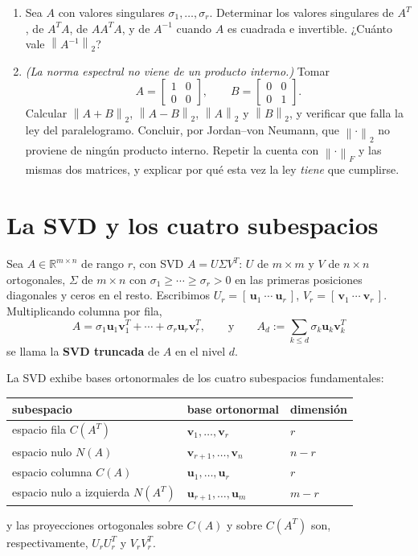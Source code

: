 \documentclass[11pt,a4paper]{article}
\newcommand{\R}{\mathbb{R}}
\newcommand{\bi}[1]{\boldsymbol{#1}}
\newcommand{\normF}[1]{\left\|#1\right\|_{F}}
\newcommand{\normdos}[1]{\left\|#1\right\|_{2}}
\begin{document}
\begin{enumerate}[label=\textbf{(\alph*)},itemsep=4pt,topsep=4pt]
\item Sea $A$ con valores singulares $\sigma_1,\dots,\sigma_r$. Determinar
los valores singulares de $A^T$, de $A^TA$, de $AA^TA$, y de $A^{-1}$ cuando
$A$ es cuadrada e invertible. ¿Cuánto vale $\normdos{A^{-1}}$?

\item \emph{(La norma espectral no viene de un producto interno.)} Tomar
\[
A=\begin{bmatrix}1&0\\ 0&0\end{bmatrix},
\qquad
B=\begin{bmatrix}0&0\\ 0&1\end{bmatrix} .
\]
Calcular $\normdos{A+B}$, $\normdos{A-B}$, $\normdos{A}$ y $\normdos{B}$, y
verificar que falla la ley del paralelogramo. Concluir, por Jordan--von
Neumann, que $\normdos{\cdot}$ no proviene de ningún producto interno.
Repetir la cuenta con $\normF{\cdot}$ y las mismas dos matrices, y explicar
por qué esta vez la ley \emph{tiene} que cumplirse.
\end{enumerate}

\section{La SVD y los cuatro subespacios}

\begin{manojo}
Sea $A\in\R^{m\times n}$ de rango $r$, con SVD $A=U\Sigma V^T$: $U$ de
$m\times m$ y $V$ de $n\times n$ ortogonales, $\Sigma$ de $m\times n$ con
$\sigma_1\ge\cdots\ge\sigma_r>0$ en las primeras posiciones diagonales y
ceros en el resto. Escribimos $U_r=[\,\bi u_1\ \cdots\ \bi u_r\,]$,
$V_r=[\,\bi v_1\ \cdots\ \bi v_r\,]$. Multiplicando columna por fila,
\[
A=\sigma_1\bi u_1\bi v_1^T+\cdots+\sigma_r\bi u_r\bi v_r^T ,
\qquad\text{y}\qquad
A_d:=\sum_{k\le d}\sigma_k\bi u_k\bi v_k^T
\]
se llama la \textbf{SVD truncada} de $A$ en el nivel $d$.

\smallskip
La SVD exhibe bases ortonormales de los cuatro subespacios fundamentales:
\begin{center}
\small
\renewcommand{\arraystretch}{1.15}
\begin{tabular}{@{}lll@{}}
\hline
subespacio & base ortonormal & dimensión\\
\hline
espacio fila $C(A^T)$ & $\bi v_1,\dots,\bi v_r$ & $r$\\
espacio nulo $N(A)$ & $\bi v_{r+1},\dots,\bi v_n$ & $n-r$\\
espacio columna $C(A)$ & $\bi u_1,\dots,\bi u_r$ & $r$\\
espacio nulo a izquierda $N(A^T)$ & $\bi u_{r+1},\dots,\bi u_m$ & $m-r$\\
\hline
\end{tabular}
\end{center}
y las proyecciones ortogonales sobre $C(A)$ y sobre $C(A^T)$ son,
respectivamente, $U_rU_r^T$ y $V_rV_r^T$.
\end{manojo}
\end{document}
